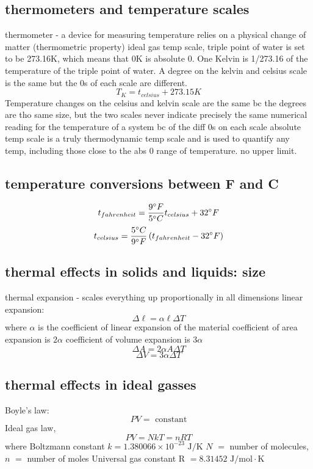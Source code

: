 \documentclass[twocolumn]{article}
\begin{document}
\subsection{thermometers and temperature scales}
\begin{outline}
\1 thermometer - a device for measuring temperature
\1 relies on a physical change of matter (thermometric property)
\1 ideal gas temp scale, triple point of water is set to be 273.16K, which means that 0K is absolute 0.
\1 One Kelvin is 1/273.16 of the temperature of the triple point of water.
\1 A degree on the kelvin and celsius scale is the same but the 0s of each scale are different. \[T_K=t_{celsius}+273.15 K\]
\1 Temperature changes on the celsius and kelvin scale are the same bc the degrees are tho same size, but the two scales never indicate precisely the same numerical reading for the temperature of a system bc of the diff 0s on each scale
\1 absolute temp scale is a truly thermodynamic temp scale and is used to quantify any temp, including those close to the abs 0 range of temperature. no upper limit.
\end{outline}
\subsection{temperature conversions between F and C}
\begin{outline}
\0 \[t_{fahrenheit}=\dfrac{9\degree F}{5\degree C}t_{celsius}+32\degree F\]
\0 \[t_{celsius}=\dfrac{5\degree C}{9\degree F}\left(t_{fahrenheit} - 32\degree F\right)\]
\end{outline}
\subsection{thermal effects in solids and liquids: size}
\begin{outline}
\1 thermal expansion - scales everything up proportionally in all dimensions
\1 linear expansion: \[\Delta\ell=\alpha\ell\Delta T\] where $\alpha$ is the coefficient of linear expansion of the material
\1 coefficient of area expansion is $2\alpha$
\1 coefficient of volume expansion is $3\alpha$
\0 \[\Delta A=2\alpha A\Delta T\] \[\Delta V=3\alpha\Delta T\]
\end{outline}
\subsection{thermal effects in ideal gasses}
\begin{outline}
\1 Boyle's law: \[PV=\text{ constant}\]
\1 Ideal gas law, \[PV=NkT=nRT\] where Boltzmann constant $k=1.380066\times10^{-23}\text{ J/K}$
\1 $N$ $=$ number of molecules, $n$ $=$ number of moles
\1 Universal gas constant R $= 8.31452 \text{ J/mol}\cdot\text{K}$
\end{outline}
\end{document}
